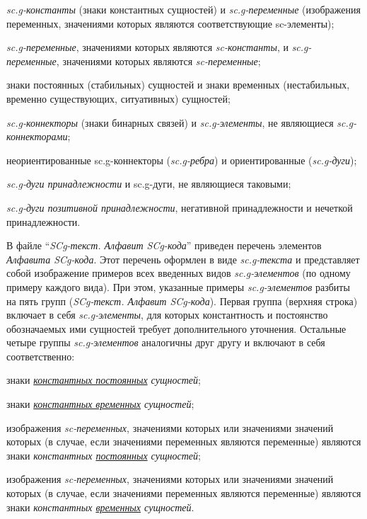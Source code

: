 \begin{SCn}
{\begin{scnitemize}
\item \textit{sc.g-константы} (знаки константных сущностей) и \textit{sc.g-переменные} (изображения переменных, значениями которых являются соответствующие sc-элементы);
\item \textit{sc.g-переменные}, значениями которых являются \textit{sc-константы}, и \textit{sc.g-переменные}, значениями которых являются \textit{sc-переменные};
\item знаки постоянных (стабильных) сущностей и знаки временных (нестабильных, временно существующих, ситуативных) сущностей;
\item \textit{sc.g-коннекторы} (знаки бинарных связей) и \textit{sc.g-элементы}, не являющиеся \textit{sc.g-коннекторами};
\item неориентированные sc.g-коннекторы (\textit{sc.g-ребра}) и ориентированные (\textit{sc.g-дуги});
\item \textit{sc.g-дуги принадлежности} и sc.g-дуги, не являющиеся таковыми;
\item \textit{sc.g-дуги позитивной принадлежности}, негативной принадлежности и нечеткой принадлежности.
\end{scnitemize}

В файле ``\textit{SCg-текст. Алфавит SCg-кода}'' приведен перечень элементов \textit{Алфавита SCg-кода}.
Этот перечень оформлен в виде \textit{sc.g-текста} и представляет собой изображение примеров всех введенных видов \textit{sc.g-элементов} (по одному примеру каждого вида). При этом, указанные примеры \textit{sc.g-элементов} разбиты на пять групп (\textit{SCg-текст. Алфавит SCg-кода}). Первая группа (верхняя строка) включает в себя \textit{sc.g-элементы}, для которых константность и постоянство обозначаемых ими сущностей требует дополнительного уточнения. Остальные четыре группы \textit{sc.g-элементов} аналогичны друг другу и включают в себя соответственно:

\begin{scnitemize}
\item знаки \textit{\uline{константных постоянных} сущностей};
\item знаки \textit{\uline{константных временных} сущностей};
\item изображения \textit{sc-переменных}, значениями которых или значениями значений которых (в случае, если значениями переменных являются переменные) являются знаки \textit{константных \uline{постоянных} сущностей};
\item изображения \textit{sc-переменных}, значениями которых или значениями значений которых (в случае, если значениями переменных являются переменные) являются знаки \textit{константных \uline{временных} сущностей}.
\end{scnitemize}

}
\end{SCn}
